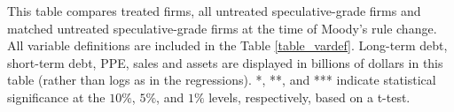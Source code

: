 \documentclass[a4paper, 12pt]{article}
\begin{document}
\begin{landscape}
\pagestyle{empty}
\begin{table}[htbp]
\caption{\textbf{Summary Statistics}
} \label{table_sum}
\begin{singlespace}
\begin{small}

\noindent This table compares treated firms, all untreated speculative-grade firms and matched untreated speculative-grade firms at the time of Moody's rule change. All variable definitions are included in the Table \ref{table_vardef}. Long-term debt, short-term debt, PPE, sales and assets are displayed in billions of dollars in this table (rather than logs as in the regressions). *, **, and *** indicate statistical significance at the $10\%$, $5\%$, and $1\%$ levels, respectively, based on a t-test.


\end{small}
\end{singlespace}
\end{table}
\end{landscape}
\end{document}
